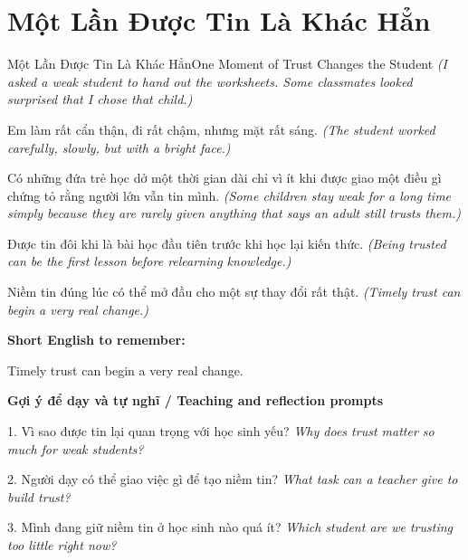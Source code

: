 \section{Một Lần Được Tin Là Khác Hẳn}
\begin{truyen}{Một Lần Được Tin Là Khác Hẳn}{One Moment of Trust Changes the Student}
\textit{(I asked a weak student to hand out the worksheets. Some classmates looked surprised that I chose that child.)}

Em làm rất cẩn thận, đi rất chậm, nhưng mặt rất sáng.
\textit{(The student worked carefully, slowly, but with a bright face.)}

Có những đứa trẻ học dở một thời gian dài chỉ vì ít khi được giao một điều gì chứng tỏ rằng người lớn vẫn tin mình.
\textit{(Some children stay weak for a long time simply because they are rarely given anything that says an adult still trusts them.)}

Được tin đôi khi là bài học đầu tiên trước khi học lại kiến thức.
\textit{(Being trusted can be the first lesson before relearning knowledge.)}

\end{truyen}

\begin{baihoc}
Niềm tin đúng lúc có thể mở đầu cho một sự thay đổi rất thật.
\textit{(Timely trust can begin a very real change.)}
\end{baihoc}

\begin{ghinhoanh}
\textbf{Short English to remember:}

Timely trust can begin a very real change.

\end{ghinhoanh}

\begin{tuhocnhanh}
\textbf{Gợi ý để dạy và tự nghĩ / Teaching and reflection prompts}

1. Vì sao được tin lại quan trọng với học sinh yếu? \textit{Why does trust matter so much for weak students?}

2. Người dạy có thể giao việc gì để tạo niềm tin? \textit{What task can a teacher give to build trust?}

3. Mình đang giữ niềm tin ở học sinh nào quá ít? \textit{Which student are we trusting too little right now?}
\end{tuhocnhanh}
